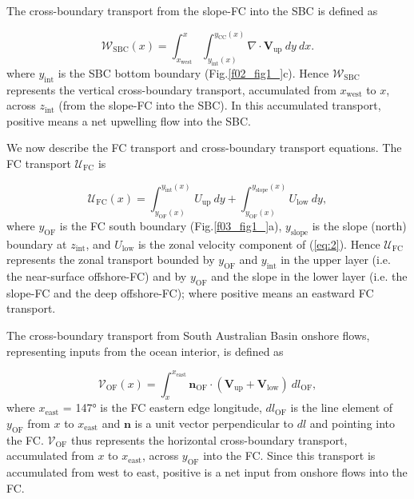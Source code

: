 \documentclass[preprint,3p,review,12pt]{elsarticle}
\renewcommand{\Vec}[1]{\mathbf{#1}}
\newcommand{\sub}[1]{_{\text{#1}}}
\begin{document}
The cross-boundary transport from the slope-FC into the SBC is defined as

\begin{equation} \label{eq:6}
\mathcal{W}\sub{SBC}(x)
= \int_{x\sub{west}}^{x} \int_{y\sub{int}(x)}^{y\sub{CC}(x)} \nabla\cdot\Vec{V}\sub{up}\ dy\ dx.
\end{equation}
%
where $y\sub{int}$ is the SBC bottom boundary (Fig.\ref{f02_fig1_}c). Hence $\mathcal{W}\sub{SBC}$ represents the vertical cross-boundary transport, accumulated from $x\sub{west}$ to $x$, across $z\sub{int}$ (from the slope-FC into the SBC). In this accumulated transport, positive means a net upwelling flow into the SBC.

We now describe the FC transport and cross-boundary transport equations. The FC transport $\mathcal{U}\sub{FC}$ is 

\begin{equation} \label{eq:7}
\mathcal{U}\sub{FC}(x) = \int_{y\sub{OF}(x)}^{y\sub{int}(x)}{U}\sub{up}\ dy
+ \int_{y\sub{OF}(x)}^{y\sub{slope}(x)}{U}\sub{low}\ dy,
\end{equation}
%
where $y\sub{OF}$ is the FC south boundary (Fig.\ref{f03_fig1_}a), $y\sub{slope}$ is the slope (north) boundary at $z\sub{int}$, and $U\sub{low}$ is the zonal velocity component of (\ref{eq:2}). Hence $\mathcal{U}\sub{FC}$ represents the zonal transport bounded by $y\sub{OF}$ and $y\sub{int}$ in the upper layer (i.e. the near-surface offshore-FC) and by $y\sub{OF}$ and the slope in the lower layer (i.e. the slope-FC and the deep offshore-FC); where positive means an eastward FC transport.

The cross-boundary transport from South Australian Basin onshore flows, representing inputs from the ocean interior, is defined as

\begin{equation} \label{eq:8}
\mathcal{V}\sub{OF}(x) = \int_{x}^{x\sub{east}}\Vec{n}\sub{OF}\cdot(\Vec{V}\sub{up} + \Vec{V}\sub{low})\ dl\sub{OF},
\end{equation}
%
where $x\sub{east}$ = \ang{147} is the FC eastern edge longitude, $dl\sub{OF}$ is the line element of $y\sub{OF}$ from $x$ to $x\sub{east}$ and $\Vec{n}$ is a unit vector perpendicular to $dl$ and pointing into the FC\@. $\mathcal{V}\sub{OF}$ thus represents the horizontal cross-boundary transport, accumulated from $x$ to $x\sub{east}$, across $y\sub{OF}$ into the FC. Since this transport is accumulated from west to east, positive is a net input from onshore flows into the FC.
\end{document}

